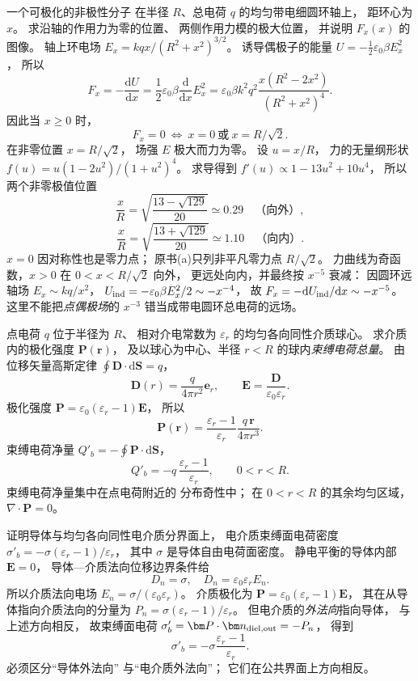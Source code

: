 一个可极化的非极性分子
在半径 $R$、总电荷 $q$ 的均匀带电细圆环轴上，
距环心为 $x$。
求沿轴的作用力为零的位置、
两侧作用力模的极大位置，
并说明 $F_x(x)$ 的图像。
\exsolution
轴上环电场
$E_x=kqx/(R^2+x^2)^{3/2}$。
诱导偶极子的能量
$U=-\frac12\varepsilon_0\beta E_x^2$，
所以
\[
F_x=-\frac{\mathrm dU}{\mathrm dx}
=\frac12\varepsilon_0\beta
\frac{\mathrm d}{\mathrm dx}E_x^2
=\varepsilon_0\beta k^2q^2
\frac{x(R^2-2x^2)}{(R^2+x^2)^4}.
\]
因此当 $x\ge0$ 时，
\[
\boxed{F_x=0\ \Longleftrightarrow\
x=0\ \text{或}\ x=R/\sqrt2}.
\]
在非零位置 $x=R/\sqrt2$，
场强 $E$ 极大而力为零。
设 $u=x/R$，
力的无量纲形状
$f(u)=u(1-2u^2)/(1+u^2)^4$。
求导得到
$f'(u)\propto1-13u^2+10u^4$，
所以两个非零极值位置
\[
\boxed{\frac{x}{R}=
\sqrt{\frac{13-\sqrt{129}}{20}}
\simeq0.29\quad\text{（向外）}},
\]
\[
\boxed{\frac{x}{R}=
\sqrt{\frac{13+\sqrt{129}}{20}}
\simeq1.10\quad\text{（向内）}}.
\]
\excheck $x=0$ 因对称性也是零力点；
原书(a)只列非平凡零力点 $R/\sqrt2$。
力曲线为奇函数，$x>0$ 在
$0<x<R/\sqrt2$ 向外，
更远处向内，并最终按 $x^{-5}$ 衰减：
因圆环远轴场 $E_x\sim kq/x^2$，
$U_{\rm ind}=-\varepsilon_0\beta E_x^2/2\sim-x^{-4}$，
故
$F_x=-\mathrm dU_{\rm ind}/\mathrm dx\sim-x^{-5}$。
这里不能把\emph{点偶极场}的 $x^{-3}$
错当成带电圆环总电荷的远场。

点电荷 $q$ 位于半径为 $R$、
相对介电常数为 $\varepsilon_r$
的均匀各向同性介质球心。
求介质内的极化强度 $\bm P(\bm r)$，
及以球心为中心、半径 $r<R$
的球内\emph{束缚电荷总量}。
\exsolution
由位移矢量高斯定律
$\oint\bm D\cdot\mathrm d\bm S=q$，
\[
\bm D(r)=\frac{q}{4\pi r^2}\bm e_r,\qquad
\bm E=\frac{\bm D}{\varepsilon_0\varepsilon_r}.
\]
极化强度
$\bm P=\varepsilon_0(\varepsilon_r-1)\bm E$，
所以
\[
\boxed{\bm P(\bm r)=
\frac{\varepsilon_r-1}{\varepsilon_r}
\frac{q\,\bm r}{4\pi r^3}}.
\]
束缚电荷净量
$Q'_b=-\oint\bm P\cdot\mathrm d\bm S$，
\[
\boxed{Q'_b=
-q\,\frac{\varepsilon_r-1}{\varepsilon_r}},
\qquad 0<r<R.
\]
\excheck 束缚电荷净量集中在点电荷附近的
分布奇性中；
在 $0<r<R$ 的其余均匀区域，
$\nabla\cdot\bm P=0$。

证明导体与均匀各向同性电介质分界面上，
电介质束缚面电荷密度
$\sigma'_b=-\sigma(\varepsilon_r-1)/\varepsilon_r$，
其中 $\sigma$ 是导体自由电荷面密度。
\exsolution
静电平衡的导体内部 $\bm E=0$，
导体—介质法向位移边界条件给
\[
D_n=\sigma,
\quad D_n=\varepsilon_0\varepsilon_r E_n.
\]
所以介质法向电场
$E_n=\sigma/(\varepsilon_0\varepsilon_r)$。
介质极化为
$\bm P=\varepsilon_0(\varepsilon_r-1)\bm E$，
其在从导体指向介质法向的分量为
$P_n=\sigma(\varepsilon_r-1)/\varepsilon_r$。
但电介质的\emph{外法向}指向导体，
与上述方向相反，
故束缚面电荷
$\sigma'_b=\bm P\cdot\bm n_{\rm diel,out}=-P_n$，
得到
\[
\boxed{\sigma'_b=
-\sigma\frac{\varepsilon_r-1}{\varepsilon_r}}.
\]
\excheck 必须区分“导体外法向”
与“电介质外法向”；
它们在公共界面上方向相反。

